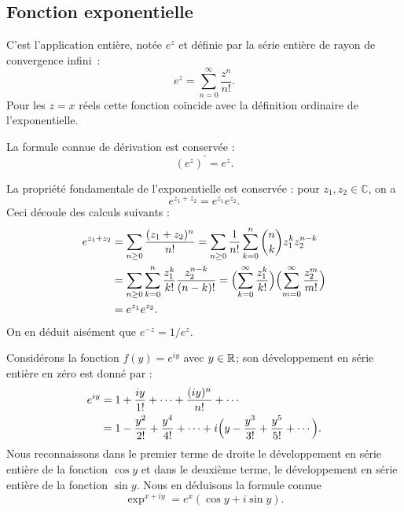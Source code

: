\subsection{Fonction exponentielle}
C'est l'application entière, notée $e^z$ et
définie par la série entière de rayon de convergence infini~:
\[
e^z = \sum_{n= 0}^\infty \frac{z^n}{n!}.\]
Pour les $z=x$ réels cette fonction coïncide avec la définition ordinaire de l'exponentielle.

La formule connue de dérivation est conservée : 
\[(e^z)^\prime=e^z.\]
 
La propriété fondamentale de l'exponentielle est conservée : pour $z_1,z_2 \in \mathbb{C}$, on a
\[e^{z_1+z_2} = e^{z_1} e^{z_2}.\]
Ceci découle des calculs suivants :
\begin{align*}
e^{z_1+z_2} & = \sum_{n \geq 0} \frac{(z_1+z_2)^n}{n!} = 
\sum_{n \geq 0} \frac{1}{n!}\sum_{k=0}^n \binom{n}{k} z_1^k z_2^{n-k} \\
& = \sum_{n \geq 0} \sum_{k=0}^n \frac{z_1^k}{k!} \frac{z_2^{n-k}}{(n-k)!} = \Bigl(\sum_{k=0}^\infty  \frac{z_1^k}{k!}\Bigr)\Bigl(\sum_{m=0}^\infty  \frac{z_2^m}{m!}\Bigr)\\
&=e^{z_1} e^{z_2}.
\end{align*}
On en déduit aisément que $e^{-z}=1/e^z$.

Considérons la fonction $f(y)=e^{iy}$ avec $y \in \mathbb R$; son développement en série entière en zéro est donné par :
\begin{align} \label{eq:exposerie}
e^{iy} &= 1+\frac{iy}{1!} +  \cdots + \frac{(iy)^n}{n!} + \cdots \\
&=1-\frac{y^2}{2!} + \frac{y^4}{4!} + \cdots + i \Bigl( y- \frac{y^3}{3!} + \frac{y^5}{5!} + \cdots \Bigr).
\end{align}
Nous reconnaissons dans le premier terme de droite le développement en série entière de la fonction $\cos y$ et dans le deuxième terme, le développement en série entière de la fonction $\sin y$. Nous en déduisons la formule connue
\[\exp^{x + i y} = e^x (\cos y + i \sin y).\]


